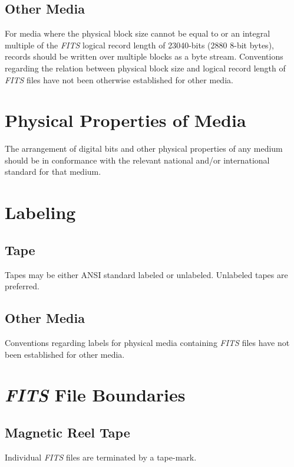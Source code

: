   \subsection{Other Media}
   For media where the physical block size cannot be equal to or
   an integral multiple of the {\em FITS\/} logical record length 
   of 23040-bits (2880 8-bit bytes), records should be written 
   over multiple blocks as a byte stream. Conventions regarding 
   the relation between physical block size and logical record 
   length of {\em FITS\/} files have 
   not been otherwise established for other media.
  
\section{Physical Properties of Media}
   The arrangement of digital bits and other physical properties of
   any medium should be in conformance with the relevant national
   and/or international standard for that medium. 

  
\section{Labeling}
  
  \subsection{Tape}
   Tapes may be either ANSI standard labeled or unlabeled.
   Unlabeled tapes are preferred.
  
  \subsection{Other Media}
   Conventions regarding labels for physical media containing 
   {\em FITS\/} files have not been established for other media.
  
\section{{\em\bf FITS\/} File Boundaries}
  
  \subsection{Magnetic Reel Tape}
   Individual {\em FITS\/} files are terminated by a tape-mark.
  
